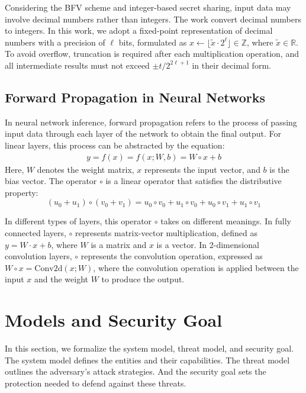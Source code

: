 \documentclass[conference]{IEEEtran}
\begin{document}
Considering the BFV scheme and integer-based secret sharing, input data may involve decimal numbers rather than integers. The work \cite{liu2024pencilprivateextensiblecollaborative,8611203} convert decimal numbers to integers. In this work, we adopt a fixed-point representation of decimal numbers with a precision of $\ell$ bits, formulated as $x \gets \lfloor \tilde{x} \cdot 2^\ell \rfloor \in \mathbb{Z}$, where $\tilde{x} \in \mathbb{R}$. To avoid overflow, truncation is required after each multiplication operation, and all intermediate results must not exceed $\pm t/2^{2\ell + 1}$ in their decimal form.

\subsection{Forward Propagation in Neural Networks}

In neural network inference, forward propagation refers to the process of passing input data through each layer of the network to obtain the final output. For linear layers, this process can be abstracted by the equation:
\begin{equation*}
\begin{array}{c}
       y=f(x)=f(x;W,b)=W\circ x+b
\end{array}
\end{equation*}
Here, $W$ denotes the weight matrix, $x$ represents the input vector, and $b$ is the bias vector. The operator $\circ$ is a linear operator that satisfies the distributive property:
\begin{equation*}
       (u_0+u_1) \circ (v_0+v_1)=u_0 \circ v_0+u_1 \circ v_0+ u_0\circ v_1+ u_1\circ v_1
\end{equation*}

In different types of layers, this operator $\circ$ takes on different meanings. In fully connected layers, $\circ$ represents matrix-vector multiplication, defined as $y=W·x+b$, where $W$ is a matrix and $x$ is a vector. In 2-dimensional convolution layers, $\circ$ represents the convolution operation, expressed as $W\circ x=\text{Conv}2\text{d}(x;W)$, where the convolution operation is applied between the input $x$ and the weight $W$ to produce the output.

\section{Models and Security Goal}
In this section, we formalize the system model, threat model, and security goal. The system model defines the entities and their capabilities. The threat model outlines the adversary's attack strategies. And the security goal sets the protection needed to defend against these threats.
\end{document}
